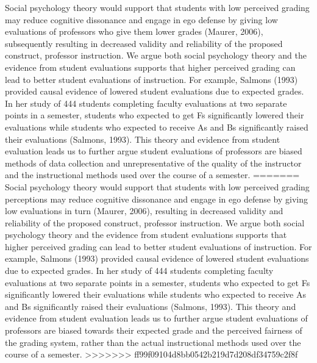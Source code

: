 \documentclass[,man]{apa6}
\theoremstyle{definition}
\theoremstyle{definition}
\theoremstyle{definition}
\theoremstyle{remark}
\begin{document}
Social psychology theory would support that students with low perceived
grading may reduce cognitive dissonance and engage in ego defense by
giving low evaluations of professors who give them lower grades (Maurer,
2006), subsequently resulting in decreased validity and reliability of
the proposed construct, professor instruction. We argue both social
psychology theory and the evidence from student evaluations supports
that higher perceived grading can lead to better student evaluations of
instruction. For example, Salmons (1993) provided causal evidence of
lowered student evaluations due to expected grades. In her study of 444
students completing faculty evaluations at two separate points in a
semester, students who expected to get Fs significantly lowered their
evaluations while students who expected to receive As and Bs
significantly raised their evaluations (Salmons, 1993). This theory and
evidence from student evaluation leads us to further argue student
evaluations of professors are biased methods of data collection and
unrepresentative of the quality of the instructor and the instructional
methods used over the course of a semester.
=======
Social psychology theory would support that students with low perceived
grading perceptions may reduce cognitive dissonance and engage in ego
defense by giving low evaluations in turn (Maurer, 2006), resulting in
decreased validity and reliability of the proposed construct, professor
instruction. We argue both social psychology theory and the evidence
from student evaluations supports that higher perceived grading can lead
to better student evaluations of instruction. For example, Salmons
(1993) provided causal evidence of lowered student evaluations due to
expected grades. In her study of 444 students completing faculty
evaluations at two separate points in a semester, students who expected
to get Fs significantly lowered their evaluations while students who
expected to receive As and Bs significantly raised their evaluations
(Salmons, 1993). This theory and evidence from student evaluation leads
us to further argue student evaluations of professors are biased towards
their expected grade and the perceived fairness of the grading system,
rather than the actual instructional methods used over the course of a
semester.
>>>>>>> ff99f09104d8bb0542b219d7d208df34759c2f8f
\end{document}
